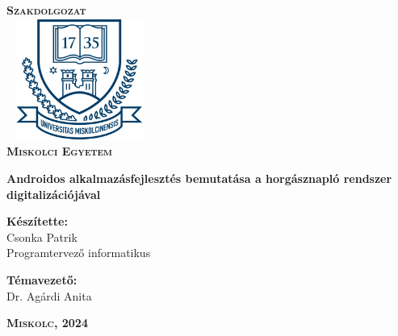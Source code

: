 \begin{titlepage}
\centering
\vspace*{2cm}
\huge\textsc{\textbf{Szakdolgozat}}\\[1cm]
\includegraphics[width=4.8cm, height=4cm,keepaspectratio]{images/me_logo.png}\\
\textbf{\textsc{Miskolci Egyetem}}

\vspace*{2cm}

{\LARGE\textbf{Androidos alkalmazásfejlesztés bemutatása 
\newline a horgásznapló rendszer digitalizációjával}}

\vspace*{2cm}
\large
\textbf{Készítette:}\\[0.8ex]
Csonka Patrik\\[0.8ex]
Programtervező informatikus

\vspace*{0.5cm}
\textbf{Témavezető:}\\[0.8ex]
Dr. Agárdi Anita

\vfill

\large
\textbf{\textsc{Miskolc, 2024}}

\end{titlepage}
